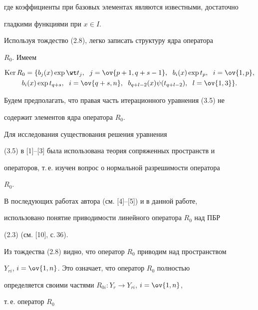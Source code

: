 где коэффициенты при базовых элементах являются известными, достаточно 


гладкими функциями при $x\in I$. 


 


Используя тождество (2.8), легко записать структуру ядра оператора 


$R_0$. Имеем 


\begin{multline*}  


\Ker R_0=\{b_j(x)\exp\wt t_j,\ \;j=\ov{p+1,q+s-1},\ \; 


b_i(x)\exp t_p,\ \; i=\ov{1,p}, \\


b_i(x)\exp t_{q+s}, \ \;i=\ov{q+s,n},\ \;


b_{q+l-2}(x)\psi(t_{q+l-2}),\ \;l=\ov{1,3}\}. 


\end{multline*} 


Будем предполагать, что правая часть итерационного уравнения (3.5) не 


содержит элементов ядра оператора $R_0$. 


 


\begin{notenonum} Для исследования существования решения уравнения 


(3.5) в [1]--[3] была использована теория сопряженных пространств и 


операторов, т.\,е. изучен вопрос о нормальной разрешимости оператора 


$R_0$. 


В последующих работах автора (см. [4]--[5]) и в данной работе, 


использовано понятие приводимости линейного оператора $R_0$ над ПБР 


(2.3) (см. [10], с.\,36). 


\end{notenonum} 


 


Из тождества (2.8) видно, что оператор $R_0$ приводим над пространством 


$Y_{ri}$, $i=\ov{1,n}$. Это означает, что оператор $R_0$ полностью 


определяется своими частями $R_{0i}:Y_r\to Y_{ri}$, $i=\ov{1,n}$, 


т.\,е. оператор $R_0$ 


